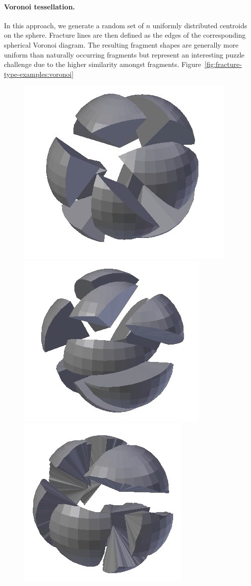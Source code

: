 \documentclass[acmlarge,screen,dvipsnames]{acmart}
\begin{document}
\paragraph{Voronoi tessellation.}
%
In this approach, we generate a random set of $n$ uniformly
distributed centroids on the sphere. Fracture lines are then defined
as the edges of the corresponding spherical Voronoi diagram.
%
The resulting fragment shapes are generally more uniform than
naturally occurring fragments but represent an interesting puzzle
challenge due to the higher similarity amongst fragments.
%
Figure~\ref{fig:fracture-type-examples:voronoi}
%
\begin{figure}[htb]
  \centering%
  {\includegraphics[width=0.30\linewidth]{images/fractureBlender}}%
  \hspace{0.2in}%
  {\includegraphics[width=0.30\linewidth]{images/fracturelowamplitude}}%
  \hspace{0.2in}%
  {\includegraphics[width=0.30\linewidth]{images/fracturestandardsmooth}}%

\end{figure}
\end{document}
